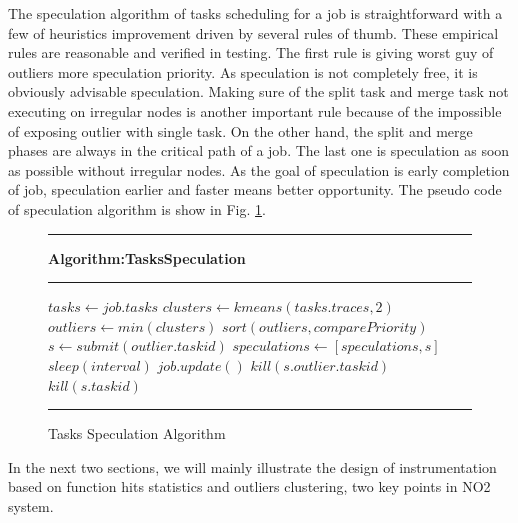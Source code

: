 The speculation algorithm of tasks scheduling for a job is straightforward with a few of heuristics improvement driven by several rules of thumb. These empirical rules are reasonable and verified in testing. The first rule is giving worst guy of outliers more speculation priority. As speculation is not completely free, it is obviously advisable speculation. Making sure of the split task and merge task not executing on irregular nodes is another important rule because of the impossible of exposing outlier with single task. On the other hand, the split and merge phases are always in the critical path of a job. The last one is speculation as soon as possible without irregular nodes. As the goal of speculation is early completion of job, speculation earlier and faster means better opportunity. The pseudo code of speculation algorithm is show in Fig. \ref{fig-spec-algo}.

\begin{figure}
\rule[-.2pt]{0.9\columnwidth}{0.9pt}
\textbf{Algorithm:TasksSpeculation}
\rule[-.2pt]{0.9\columnwidth}{0.5pt}

\begin{algorithmic}[1]




    \State $tasks\gets job.tasks$
    \State $clusters\gets kmeans(tasks.traces, 2)$
        \State $outliers\gets min(clusters)$
        \State $sort(outliers, comparePriority)$
            \State $s\gets submit(outlier.taskid)$
            \State $speculations\gets [speculations, s]$
        \EndFor
    \EndIf
    \State $sleep(interval)$
    \State $job.update()$
            \State $kill(s.outlier.taskid)$
            \State $kill(s.taskid)$
        \EndIf
    \EndFor
\EndWhile\label{specendwhile}
\end{algorithmic}
\rule[-.2pt]{0.9\columnwidth}{0.8pt}
\caption{Tasks Speculation Algorithm}\label{fig-spec-algo}
\end{figure}

In the next two sections, we will mainly illustrate the design of instrumentation based on function hits statistics and outliers clustering, two key points in NO2 system.
